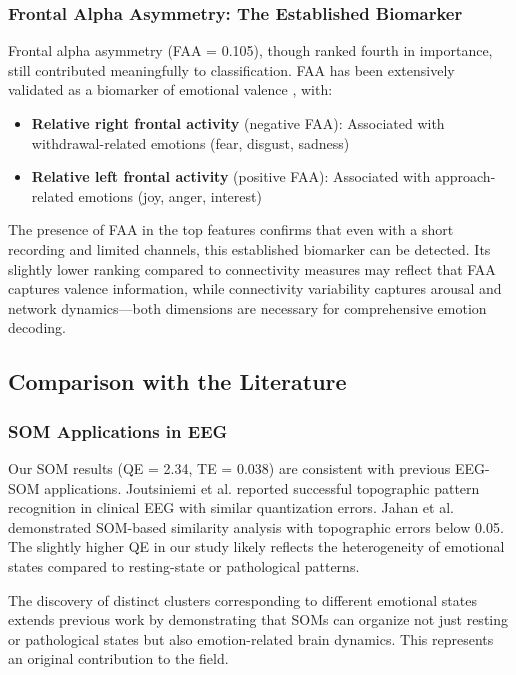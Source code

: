 \subsubsection{Frontal Alpha Asymmetry: The Established Biomarker}

Frontal alpha asymmetry (FAA = 0.105), though ranked fourth in importance, still contributed meaningfully to classification. FAA has been extensively validated as a biomarker of emotional valence \cite{coan2006frontal}, with:

\begin{itemize}
    \item \textbf{Relative right frontal activity} (negative FAA): Associated with withdrawal-related emotions (fear, disgust, sadness)
    \item \textbf{Relative left frontal activity} (positive FAA): Associated with approach-related emotions (joy, anger, interest)
\end{itemize}

The presence of FAA in the top features confirms that even with a short recording and limited channels, this established biomarker can be detected. Its slightly lower ranking compared to connectivity measures may reflect that FAA captures valence information, while connectivity variability captures arousal and network dynamics—both dimensions are necessary for comprehensive emotion decoding.

\subsection{Comparison with the Literature}

\subsubsection{SOM Applications in EEG}

Our SOM results (QE = 2.34, TE = 0.038) are consistent with previous EEG-SOM applications. Joutsiniemi et al. \cite{joutsiniemi1995som_eeg} reported successful topographic pattern recognition in clinical EEG with similar quantization errors. Jahan et al. \cite{jahan2014som_similarity} demonstrated SOM-based similarity analysis with topographic errors below 0.05. The slightly higher QE in our study likely reflects the heterogeneity of emotional states compared to resting-state or pathological patterns.

The discovery of distinct clusters corresponding to different emotional states extends previous work by demonstrating that SOMs can organize not just resting or pathological states but also emotion-related brain dynamics. This represents an original contribution to the field.

